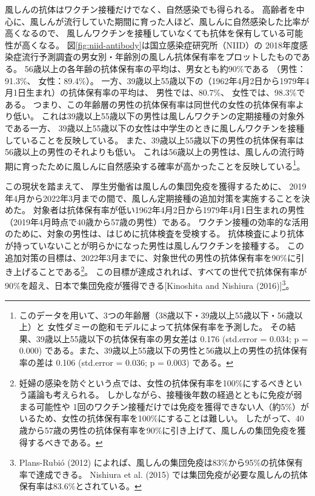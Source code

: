 \documentclass[
  11pt,
  a4paper,
]{article}
\begin{document}
風しんの抗体はワクチン接種だけでなく、自然感染でも得られる。
高齢者を中心に、風しんが流行していた期間に育った人ほど、風しんに自然感染した比率が高くなるので、
風しんワクチンを接種していなくても抗体を保有している可能性が高くなる。
図\ref{fig:niid-antibody}は国立感染症研究所（NIID）の
2018年度感染症流行予測調査の男女別・年齢別の風しん抗体保有率をプロットしたものである。
56歳以上の各年齢の抗体保有率の平均は、男女とも約90\%である
（男性：91.3\%、
女性：89.4\%）。
一方、39歳以上55歳以下の（1962年4月2日から1979年4月1日生まれ）の抗体保有率の平均は、
男性では、80.7\%、
女性では、98.3\%である。
つまり、この年齢層の男性の抗体保有率は同世代の女性の抗体保有率より低い。
これは39歳以上55歳以下の男性は風しんワクチンの定期接種の対象外である一方、
39歳以上55歳以下の女性は中学生のときに風しんワクチンを接種していることを反映している。
また、39歳以上55歳以下の男性の抗体保有率は56歳以上の男性のそれよりも低い。
これは56歳以上の男性は、風しんの流行時期に育ったために風しんに自然感染する確率が高かったことを反映している\footnote{このデータを用いて、3つの年齢層（38歳以下・39歳以上55歳以下・56歳以上）と
  女性ダミーの飽和モデルによって抗体保有率を予測した。
  その結果、39歳以上55歳以下の抗体保有率の男女差は
  0.176 (std.error = 0.034; p = 0.000)
  である。また、39歳以上55歳以下の男性と56歳以上の男性の抗体保有率の差は
  0.106 (std.error = 0.036; p = 0.003)
  である。}。

この現状を踏まえて、
厚生労働省は風しんの集団免疫を獲得するために、
2019年4月から2022年3月までの間で、風しん定期接種の追加対策を実施することを決めた。
対象者は抗体保有率が低い1962年4月2日から1979年4月1日生まれの男性（2019年4月時点で40歳から57歳の男性）である。
ワクチン接種の効率的な活用のために、対象の男性は、はじめに抗体検査を受検する。
抗体検査により抗体が持っていないことが明らかになった男性は風しんワクチンを接種する。
この追加対策の目標は、2022年3月までに、対象世代の男性の抗体保有率を90\%に引き上げることである\footnote{妊婦の感染を防ぐという点では、女性の抗体保有率を100\%にするべきという議論も考えられる。
  しかしながら、接種後年数の経過とともに免疫が弱まる可能性や
  1回のワクチン接種だけでは免疫を獲得できない人（約5\%）がいるため、女性の抗体保有率を100\%にすることは難しい。
  したがって、40歳から57歳の男性の抗体保有率を90\%に引き上げて、風しんの集団免疫を獲得するべきである。}。
この目標が達成されれば、すべての世代で抗体保有率が90\%を超え、日本で集団免疫が獲得できる{[}Kinoshita and Nishiura (2016){]}\footnote{Plans-Rubió (2012) によれば、風しんの集団免疫は83\%から95\%の抗体保有率で達成できる。
  Nishiura et al. (2015) では集団免疫が必要な風しんの抗体保有率は83.6\%とされている。}。
\end{document}
